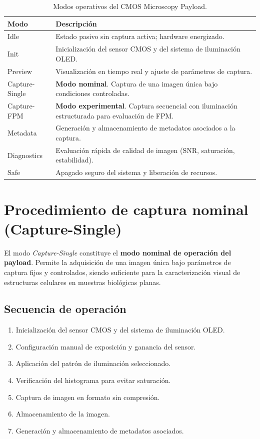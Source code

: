 \begin{table}[H]
\centering
\begin{tabular}{p{3.5cm} p{9.5cm}}
\toprule
\textbf{Modo} & \textbf{Descripción} \\
\midrule
Idle & Estado pasivo sin captura activa; hardware energizado. \\
Init & Inicialización del sensor CMOS y del sistema de iluminación OLED. \\
Preview & Visualización en tiempo real y ajuste de parámetros de captura. \\
Capture-Single & \textbf{Modo nominal}. Captura de una imagen única bajo
condiciones controladas. \\
Capture-FPM & \textbf{Modo experimental}. Captura secuencial con iluminación
estructurada para evaluación de FPM. \\
Metadata & Generación y almacenamiento de metadatos asociados a la captura. \\
Diagnostics & Evaluación rápida de calidad de imagen (SNR, saturación, estabilidad). \\
Safe & Apagado seguro del sistema y liberación de recursos. \\
\bottomrule
\end{tabular}
\caption{Modos operativos del CMOS Microscopy Payload.}
\end{table}

\section{Procedimiento de captura nominal (Capture-Single)}

El modo \textit{Capture-Single} constituye el \textbf{modo nominal de operación
del payload}. Permite la adquisición de una imagen única bajo parámetros de
captura fijos y controlados, siendo suficiente para la caracterización visual de
estructuras celulares en muestras biológicas planas.

\subsection*{Secuencia de operación}

\begin{enumerate}
    \item Inicialización del sensor CMOS y del sistema de iluminación OLED.
    \item Configuración manual de exposición y ganancia del sensor.
    \item Aplicación del patrón de iluminación seleccionado.
    \item Verificación del histograma para evitar saturación.
    \item Captura de imagen en formato sin compresión.
    \item Almacenamiento de la imagen.
    \item Generación y almacenamiento de metadatos asociados.
\end{enumerate}

